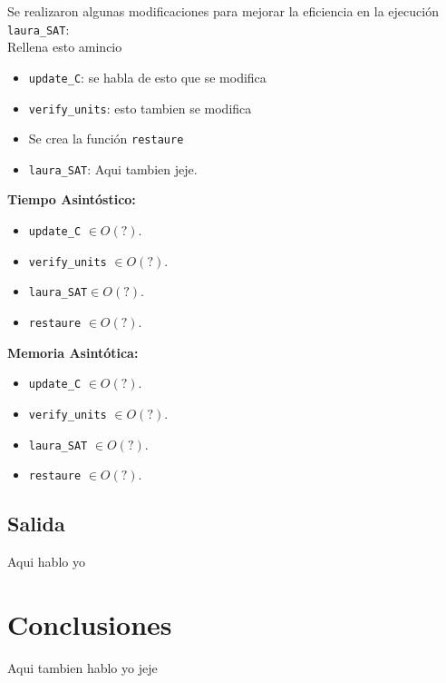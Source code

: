 \documentclass[letterpaper,12pt]{article}
\begin{document}
Se realizaron algunas modificaciones para mejorar la eficiencia en la ejecución \texttt{laura\_SAT}:\\

Rellena esto amincio
\begin{itemize}
	\item \texttt{update\_C}: se habla de esto que se modifica
	
	\item \texttt{verify\_units}: esto tambien se modifica 
	
	\item Se crea la función \texttt{restaure}
	
	\item \texttt{laura\_SAT}: Aqui tambien jeje.
\end{itemize}

\textbf{Tiempo Asintóstico:}

\begin{itemize}
	\item \texttt{update\_C} $\in O(?)$.

	\item \texttt{verify\_units} $\in O(?)$. 

	\item \texttt{laura\_SAT}$\in O(?)$.
		 
	\item \texttt{restaure} $\in O(?)$.
\end{itemize}

\textbf{Memoria Asintótica:} 
\begin{itemize}
	\item \texttt{update\_C} $\in O(?)$.

	\item \texttt{verify\_units} $\in O(?)$.

	\item \texttt{laura\_SAT} $\in O(?)$. 

	\item \texttt{restaure} $\in O(?)$.
\end{itemize}

\subsection{Salida}

Aqui hablo yo

\section{Conclusiones}

Aqui tambien hablo yo jeje
\end{document}
